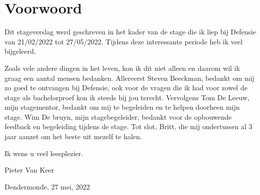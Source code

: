 \section{Voorwoord}
\label{sec:voorwoord}




Dit stageverslag werd geschreven in het kader van de stage die ik liep bij Defensie van 21/02/2022 tot 27/05/2022. Tijdens deze interessante periode heb ik veel bijgeleerd.

Zoals vele andere dingen in het leven, kon ik dit niet alleen en daarom wil ik graag een aantal mensen bedanken. Allereerst Steven Beeckman, bedankt om mij zo goed te ontvangen bij Defensie, ook voor de vragen die ik had voor zowel de stage als bachelorproef kon ik steeds bij jou terecht. Vervolgens Tom De Leeuw, mijn stagementor, bedankt om mij te begeleiden en te helpen doorheen mijn stage. Wim De bruyn, mijn stagebegeleider, bedankt voor de opbouwende feedback en begeleiding tijdens de stage. Tot slot, Britt, die mij ondertussen al 3 jaar aanzet om het beste uit mezelf te halen.

\begin{flushleft}
    
Ik wens u veel leesplezier.
\end{flushleft}

\begin{flushleft}

Pieter Van Keer

Dendermonde, 27 mei, 2022

\end{flushleft}